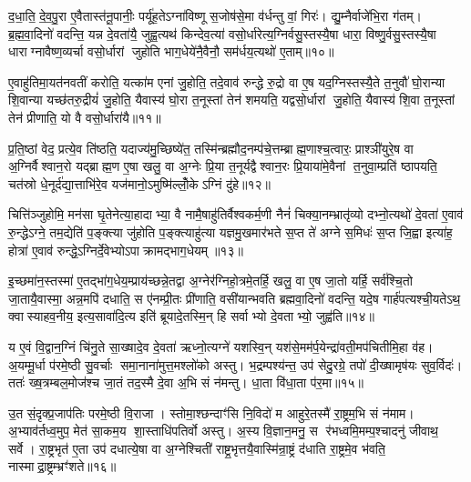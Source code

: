 द॒धा॒ति॒ दे॒व॒पु॒रा ए॒वैतास्त॑नू॒पानीः॒ पर्यू॑ह॒तेऽग्ना॑विष्णू स॒जोष॑से॒मा व॑र्धन्तु वां॒ गिरः॑। द्यु॒म्नैर्वाजे॑भि॒रा ग॑तम्। ब्र॒ह्म॒वा॒दिनो॑ वदन्ति॒ यन्न दे॒वता॑यै॒ जुह्व॒त्यथ॑ किन्देव॒त्या॑ वसो॒र्धारेत्य॒ग्निर्वसु॒स्तस्यै॒षा धारा॒ विष्णु॒र्वसु॒स्तस्यै॒षा धाराग्नावैष्ण॒व्यर्चा वसो॒र्धारां जुहोति भाग॒धेये॑नै॒वैनौ॒ सम॑र्धय॒त्यथो॑ ए॒ताम्॥१०॥

ए॒वाहु॑तिमा॒यत॑नवतीं करोति॒ यत्का॑म एनां जु॒होति॒ तदे॒वाव॑ रुन्द्धे रु॒द्रो वा ए॒ष यद॒ग्निस्तस्यै॒ते त॒नुवौ॑ घो॒रान्या शि॒वान्या यच्छ॑तरु॒द्रीयं॑ जु॒होति॒ यैवास्य॑ घो॒रा त॒नूस्तां तेन॑ शमयति॒ यद्वसो॒र्धारां जु॒होति॒ यैवास्य॑ शि॒वा त॒नूस्तां तेन॑ प्रीणाति॒ यो वै वसो॒र्धारा॑यै॥११॥

प्र॒ति॒ष्ठां वेद॒ प्रत्ये॒व ति॑ष्ठति॒ यदाज्य॑मु॒च्छिष्ये॑त॒ तस्मि॑न्ब्रह्मौद॒नम्प॑चे॒त्तम्ब्राह्म॒णाश्च॒त्वारः॒ प्राश्ञी॑युरे॒ष वा अ॒ग्निर्वैश्वान॒रो यद्ब्राह्म॒ण ए॒षा खलु॒ वा अ॒ग्नेः प्रि॒या त॒नूर्यद्वैश्वान॒रः प्रि॒याया॑मे॒वैनां त॒नुवा॒म्प्रति॑ ष्ठापयति॒ चत॑स्रो धे॒नूर्द॑द्या॒त्ताभि॑रे॒व यज॑मानो॒ऽमुष्मि॑ल्लोँ॒केऽग्निं दु॑हे॥१२॥

{\anuvakamend[{उपै॒तान्धारा॑यै॒ षट्च॑त्वारिशच्च॥३॥}]}

चित्ति॑ञ्जुहोमि॒ मन॑सा घृ॒तेनेत्या॒हादाभ्या॒ वै नामै॒षाहु॑तिर्वैश्वकर्म॒णी नैनं॑ चिक्या॒नम्भ्रातृ॑व्यो दभ्नो॒त्यथो॑ दे॒वता॑ ए॒वाव॑ रु॒न्द्धेऽग्ने॒ तम॒द्येति॑ प॒ङ्क्त्या जु॑होति प॒ङ्क्त्याहु॑त्या यज्ञमु॒खमार॑भते स॒प्त ते॑ अग्ने स॒मिधः॑ स॒प्त जि॒ह्वा इत्या॑ह॒ होत्रा॑ ए॒वाव॑ रुन्द्धे॒ऽग्निर्दे॒वेभ्योऽपाक्रामद्भाग॒धेयम्॥१३॥

इ॒च्छमा॑न॒स्तस्मा॑ ए॒तद्भा॑ग॒धेय॒म्प्राय॑च्छन्ने॒तद्वा अ॒ग्नेर॑ग्निहो॒त्रमे॒तर्\mbox{}हि॒ खलु॒ वा ए॒ष जा॒तो यर्\mbox{}हि॒ सर्व॑श्चि॒तो जा॒तायै॒वास्मा॒ अन्न॒मपि॑ दधाति॒ स ए॑नम्प्री॒तः प्री॑णाति॒ वसी॑यान्भवति ब्रह्मवा॒दिनो॑ वदन्ति॒ यदे॒ष गार्\mbox{}ह॑पत्यश्ची॒यतेऽथ॒ क्वास्याहव॒नीय॒ इत्य॒सावा॑दि॒त्य इति॑ ब्रूयादे॒तस्मि॒न् हि सर्वाभ्यो दे॒वताभ्यो॒ जुह्व॑ति॥१४॥

य ए॒वं वि॒द्वान॒ग्निं चि॑नु॒ते सा॒ख्षादे॒व दे॒वता॑ ऋध्नो॒त्यग्ने॑ यशस्वि॒न् यश॑से॒मम॑र्प॒येन्द्रा॑वती॒मप॑चितीमि॒हा व॑ह। अ॒यम्मू॒र्धा प॑रमे॒ष्ठी सु॒वर्चाः समा॒नाना॑मुत्त॒मश्लो॑को अस्तु। भ॒द्रम्पश्य॑न्त॒ उप॑ सेदु॒रग्रे॒ तपो॑ दी॒ख्षामृष॑यः सुव॒र्विदः॑। ततः॑ ख्ष॒त्रम्बल॒मोज॑श्च जा॒तं तद॒स्मै दे॒वा अ॒भि सं न॑मन्तु। धा॒ता वि॑धा॒ता प॑र॒मा॥१५॥

उ॒त सं॒दृक्प्र॒जाप॑तिः परमे॒ष्ठी वि॒राजा। स्तोमा॒श्छन्दाꣳ॑सि नि॒विदो॑ म आहुरे॒तस्मै॑ रा॒ष्ट्रम॒भि सं न॑माम। अ॒भ्याव॑र्तध्व॒मुप॒ मेत॑ सा॒कम॒य शा॒स्ताधि॑पतिर्वो अस्तु। अ॒स्य वि॒ज्ञान॒मनु॒ स र॑भध्वमि॒मम्प॒श्चादनु॑ जीवाथ॒ सर्वे। रा॒ष्ट्रभृत॑ ए॒ता उप॑ दधात्ये॒षा वा अ॒ग्नेश्चिती॑ राष्ट्र॒भृत्तयै॒वास्मि॑न्रा॒ष्ट्रं द॑धाति रा॒ष्ट्रमे॒व भ॑वति॒ नास्माद्रा॒ष्ट्रम्भ्रꣳ॑शते॥१६॥

